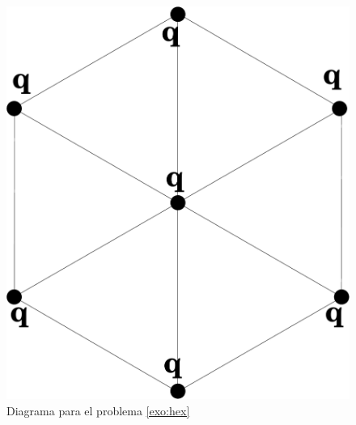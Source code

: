 \documentclass{article}
\begin{document}
\begin{figure}[h!]
\begin{center}
\includegraphics[scale=0.20]{figs/hexagono.pdf}
\end{center}
\caption{Diagrama para el problema \ref{exo:hex}}
\label{fig:hex}
\end{figure}
\end{document}
